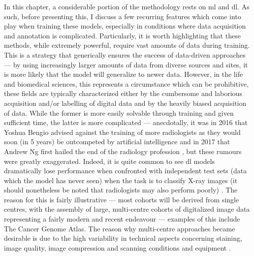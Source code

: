 In this chapter, a considerable portion of the methodology rests on \ac{ml} and \ac{dl}. As such, before presenting this, I discuss a few recurring features which come into play when training these models, especially in conditions where data acquisition and annotation is complicated. Particularly, it is worth highlighting that these methods, while extremely powerful, require vast amounts of data during training. This is a strategy that generically ensures the success of data-driven approaches --- by using increasingly larger amounts of data from diverse sources and sites, it is more likely that the model will generalize to newer data. However, in the life and biomedical sciences, this represents a circumstance which can be prohibitive, these fields are typically characterized either by the cumbersome and laborious acquisition and/or labelling of digital data and by the heavily biased acquisition of data. While the former is more easily solvable through training and given sufficient time, the latter is more complicated --- anecdotally, it was in 2016 that Yoshua Bengio advised against the training of more radiologists as they would soon (in 5 years) be outcompeted by artificial intelligence \cite{Creative_Destruction_Lab2016-zf} and in 2017 that Andrew Ng first hailed the end of the radiology profession \cite{Ng2017-tz}, but these rumours were greatly exaggerated. Indeed, it is quite common to see \ac{dl} models dramatically lose performance when confronted with independent test sets (data which the model has never seen) when the task is to classify X-ray images (it should nonetheless be noted that radiologists may also perform poorly) \cite{Rajpurkar2021-bj}. The reason for this is fairly illustrative --- most cohorts will be derived from single centres, with the assembly of large, multi-centre cohorts of digitalized image data representing a fairly modern and recent endeavour --- examples of this include The Cancer Genome Atlas. The reason why multi-centre approaches became desirable is due to the high variability in technical aspects concerning staining, image quality, image compression and scanning conditions and equipment \cite{Van_der_Laak2021-id}.

